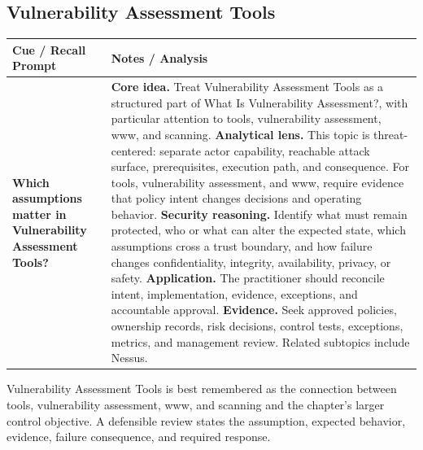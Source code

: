 \documentclass[11pt]{article}
\newcommand{\CornellHeader}{%
\rowcolor{Navy}\color{white}\bfseries Cue / Recall Prompt & \color{white}\bfseries Notes / Analysis\\\hline}
\newcommand{\CornellRow}[2]{%
\cellcolor{CueGray}\RaggedRight\textbf{#1} & \RaggedRight #2\\\hline}
\begin{document}
\subsection*{Vulnerability Assessment Tools}
\begin{longtable}{>{\RaggedRight\arraybackslash}p{}|>{\RaggedRight\arraybackslash}p{}}
\CornellHeader
\CornellRow{Which assumptions matter in Vulnerability Assessment Tools?}{\textbf{Core idea.} Treat Vulnerability Assessment Tools as a structured part of What Is Vulnerability Assessment?, with particular attention to tools, vulnerability assessment, www, and scanning. \textbf{Analytical lens.} This topic is threat-centered: separate actor capability, reachable attack surface, prerequisites, execution path, and consequence. For tools, vulnerability assessment, and www, require evidence that policy intent changes decisions and operating behavior. \textbf{Security reasoning.} Identify what must remain protected, who or what can alter the expected state, which assumptions cross a trust boundary, and how failure changes confidentiality, integrity, availability, privacy, or safety. \textbf{Application.} The practitioner should reconcile intent, implementation, evidence, exceptions, and accountable approval. \textbf{Evidence.} Seek approved policies, ownership records, risk decisions, control tests, exceptions, metrics, and management review. Related subtopics include Nessus.}
\end{longtable}
\begin{topicsummary}
Vulnerability Assessment Tools is best remembered as the connection between tools, vulnerability assessment, www, and scanning and the chapter's larger control objective. A defensible review states the assumption, expected behavior, evidence, failure consequence, and required response.
\end{topicsummary}
\end{document}
